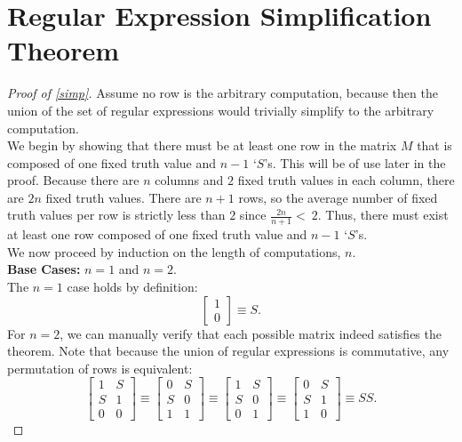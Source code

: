 \documentclass[runningheads]{llncs}
\begin{document}
\section{Regular Expression Simplification Theorem} \label{simp appendix}
\begin{proof}[Proof of \ref{simp}]
Assume no row is the arbitrary computation, because then the union of the set of regular expressions would trivially simplify to the arbitrary computation.\\
We begin by showing that there must be at least one row in the matrix $M$ that is composed of one fixed truth value and $n-1$ `$S$'s. This will be of use later in the proof. Because there are $n$ columns and $2$ fixed truth values in each column, there are $2n$ fixed truth values. There are $n+1$ rows, so the average number of fixed truth values per row is strictly less than $2$ since $\frac{2n}{n+1} < \ 2$.
Thus, there must exist at least one row composed of one fixed truth value and $n-1$ `$S$'s. \\
\noindent We now proceed by induction on the length of computations, $n$. \\
\textbf{Base Cases:} $n=1$ and $n=2$. \\
The $n=1$ case holds by definition:
    $$\begin{bmatrix}
    1\\
    0
    \end{bmatrix}  \equiv S.$$
For $n=2$, we can manually verify that each possible matrix indeed satisfies the theorem. Note that because the union of regular expressions is commutative, any permutation of rows is equivalent:
        $$\begin{bmatrix}
    1 & S\\
    S & 1\\
    0 & 0
    \end{bmatrix}  \equiv \begin{bmatrix}
    0 & S\\
    S & 0\\
    1 & 1
    \end{bmatrix} \equiv \begin{bmatrix}
    1 & S\\
    S & 0\\
    0 & 1
    \end{bmatrix} \equiv \begin{bmatrix}
    0 & S\\
    S & 1\\
    1 & 0
    \end{bmatrix} \equiv SS.
$$
\end{proof}
\end{document}
